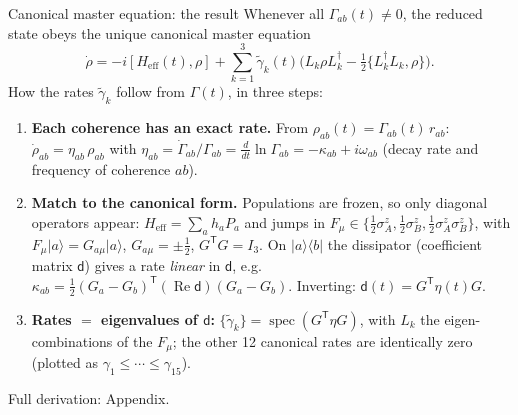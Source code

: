 \documentclass[aspectratio=169,11pt]{beamer}
\newcommand{\ket}[1]{\lvert #1\rangle}
\newcommand{\bra}[1]{\langle #1\rvert}
\newcommand{\spec}{\operatorname{spec}}
\newcommand{\dmat}{\mathsf d}
\newcommand{\Heff}{H_{\mathrm{eff}}}
\begin{document}
\begin{frame}{Canonical master equation: the result}
\small
Whenever all $\Gamma_{ab}(t)\neq0$, the reduced state obeys the unique canonical master equation \cite{Hall2014}
\[
\dot\rho=-i[\Heff(t),\rho]+\textstyle\sum_{k=1}^{3}\tilde\gamma_k(t)\bigl(L_k\rho L_k^\dagger-\tfrac12\{L_k^\dagger L_k,\rho\}\bigr).
\]
How the rates $\tilde\gamma_k$ follow from $\Gamma(t)$, in three steps:
\begin{enumerate}\setlength\itemsep{3pt}
\item \textbf{Each coherence has an exact rate.} From $\rho_{ab}(t)=\Gamma_{ab}(t)\,r_{ab}$: $\dot\rho_{ab}=\eta_{ab}\,\rho_{ab}$ with
$\eta_{ab}=\dot\Gamma_{ab}/\Gamma_{ab}=\tfrac{d}{dt}\ln\Gamma_{ab}=-\kappa_{ab}+i\omega_{ab}$ (decay rate and frequency of coherence $ab$).
\item \textbf{Match to the canonical form.} Populations are frozen, so only diagonal operators appear: $\Heff=\sum_ah_aP_a$ and jumps in $F_\mu\in\{\tfrac12\sigma^z_A,\tfrac12\sigma^z_B,\tfrac12\sigma^z_A\sigma^z_B\}$, with $F_\mu\ket a=G_{a\mu}\ket a$, $G_{a\mu}=\pm\tfrac12$, $G^{\mathsf T}G=I_3$. On $\ket a\bra b$ the dissipator (coefficient matrix $\dmat$) gives a rate \emph{linear} in $\dmat$, e.g.\ $\kappa_{ab}=\tfrac12(G_a-G_b)^{\mathsf T}(\operatorname{Re}\dmat)(G_a-G_b)$. Inverting: $\dmat(t)=G^{\mathsf T}\eta(t)G$.
\item \textbf{Rates $=$ eigenvalues of $\dmat$:} $\{\tilde\gamma_k\}=\spec(G^{\mathsf T}\eta G)$, with $L_k$ the eigen-combinations of the $F_\mu$; the other 12 canonical rates are identically zero (plotted as $\gamma_1\le\cdots\le\gamma_{15}$).
\end{enumerate}
\medskip
\begin{center}
\end{center}
{\color{muted}\footnotesize Full derivation: Appendix.}
\end{frame}
\end{document}
